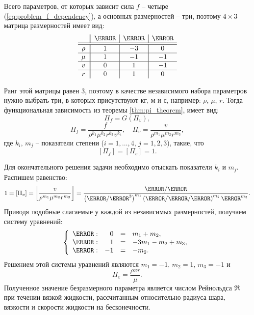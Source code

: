 \documentclass[14pt]{extarticle}
\begin{document}
Всего параметров, от которых зависит сила $f$ -- четыре (\ref{eq:problem_f_dependency}), а основных размерностей -- три, поэтому $4 \times 3$ матрица размерностей имеет вид:
\[
\begin{array}{c||c|c|c}
		& \kg & \m &  \s \\
	\hline
	\hline
	\rho & 1 & -3 & 0 \\
	\hline
	\mu & 1 & -1 & -1 \\
	\hline
	v & 0 & 1 & -1 \\
	\hline
	r & 0 & 1 & 0 \\
\end{array}
\]

Ранг этой матрицы равен $3$, поэтому в качестве независимого набора параметров нужно выбрать три, в которых присутствуют кг, м и с, например: $\rho$, $\mu$, $r$. Тогда функциональная зависимость из теоремы \ref{thm:pi_theorem}, имеет вид:
\[
\Pi_f =  G(\Pi_v),
\]
\[
\Pi_f = \frac{f}{\rho^{k_1} \mu^{k_2} r^{k_3} v^{k_4}},\quad
\Pi_v = \frac{v}{\rho^{m_1} \mu^{m_2} r^{m_3}},
\]
где $k_i$, $m_j$ -- показатели степени ($i=1,\ldots,4$, $j=1,2,3$), такие, что
\[
[\Pi_f] = [\Pi_v] = 1.
\]

Для окончательного решения задачи необходимо отыскать показатели $k_i$ и $m_j$.
Распишем равенство:
\[
1 =  [\Pi_v] = \left[\frac{v}{\rho^{m_1} \mu^{m_2} r^{m_3}}\right] = 
\frac{\m/\s}{ 
	\left( \kg/\m^3       \right)^{m_1}
	\left(\kg/\m/\s\right)^{m_2}
	\m^{m_3}
}.
\]
Приводя подобные слагаемые у каждой из независимых размерностей, получаем систему уравнений:
\[
\left\{
\begin{array}{lrcl}
	\kg: &
	0 &  = & m_1 + m_2, \\
	\m: & 
	1 & = & -3 m_1 - m_2 + m_3,\\
	\s: &
	-1 & = &  -m_2.
\end{array}
\right.
\]
Решением этой системы уравнений являются $m_1 = -1$, $m_2 = 1$, $m_3 = -1$ и
\[
\Pi_v = \frac{\rho v r}{\mu}.
\]
Полученное значение безразмерного параметра является числом Рейнольдса $\Re$ при течении вязкой жидкости, рассчитанным относительно радиуса шара, вязкости и скорости жидкости на бесконечности.
\end{document}
